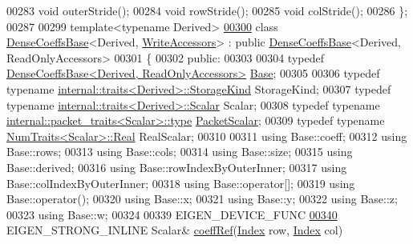 \begin{DoxyCode}
00283     \textcolor{keywordtype}{void} outerStride();
00284     \textcolor{keywordtype}{void} rowStride();
00285     \textcolor{keywordtype}{void} colStride();
00286 \};
00287 
00299 \textcolor{keyword}{template}<\textcolor{keyword}{typename} Derived>
\hyperlink{group___core___module}{00300} \textcolor{keyword}{class }\hyperlink{class_eigen_1_1_dense_coeffs_base}{DenseCoeffsBase}<Derived, \hyperlink{group__enums_gga9f93eac38eb83deb0e8dbd42ddf11d5da2c59ef3697d65866c3a8e16eda7881ab}{WriteAccessors}> : \textcolor{keyword}{public} 
      \hyperlink{class_eigen_1_1_dense_coeffs_base}{DenseCoeffsBase}<Derived, ReadOnlyAccessors>
00301 \{
00302   \textcolor{keyword}{public}:
00303 
00304     \textcolor{keyword}{typedef} \hyperlink{group___core___module_class_eigen_1_1_dense_coeffs_base_3_01_derived_00_01_read_only_accessors_01_4}{DenseCoeffsBase<Derived, ReadOnlyAccessors>} 
      \hyperlink{group___core___module_struct_eigen_1_1_eigen_base}{Base};
00305 
00306     \textcolor{keyword}{typedef} \textcolor{keyword}{typename} \hyperlink{struct_eigen_1_1internal_1_1traits}{internal::traits<Derived>::StorageKind} 
      StorageKind;
00307     \textcolor{keyword}{typedef} \textcolor{keyword}{typename} \hyperlink{struct_eigen_1_1internal_1_1traits}{internal::traits<Derived>::Scalar} Scalar;
00308     \textcolor{keyword}{typedef} \textcolor{keyword}{typename} \hyperlink{group___sparse_core___module}{internal::packet\_traits<Scalar>::type} 
      \hyperlink{group___sparse_core___module}{PacketScalar};
00309     \textcolor{keyword}{typedef} \textcolor{keyword}{typename} \hyperlink{group___core___module_struct_eigen_1_1_num_traits}{NumTraits<Scalar>::Real} RealScalar;
00310 
00311     \textcolor{keyword}{using} Base::coeff;
00312     \textcolor{keyword}{using} Base::rows;
00313     \textcolor{keyword}{using} Base::cols;
00314     \textcolor{keyword}{using} Base::size;
00315     \textcolor{keyword}{using} Base::derived;
00316     \textcolor{keyword}{using} Base::rowIndexByOuterInner;
00317     \textcolor{keyword}{using} Base::colIndexByOuterInner;
00318     \textcolor{keyword}{using} Base::operator[];
00319     \textcolor{keyword}{using} Base::operator();
00320     \textcolor{keyword}{using} Base::x;
00321     \textcolor{keyword}{using} Base::y;
00322     \textcolor{keyword}{using} Base::z;
00323     \textcolor{keyword}{using} Base::w;
00324 
00339     EIGEN\_DEVICE\_FUNC
\hyperlink{group___core___module_adf14e9563a1d2a39a6fee334dfcfb105}{00340}     EIGEN\_STRONG\_INLINE Scalar& \hyperlink{group___core___module_adf14e9563a1d2a39a6fee334dfcfb105}{coeffRef}(\hyperlink{group___core___module_a554f30542cc2316add4b1ea0a492ff02}{Index} row, \hyperlink{group___core___module_a554f30542cc2316add4b1ea0a492ff02}{Index} col)

\end{DoxyCode}
